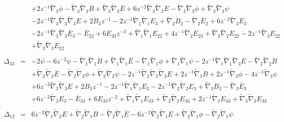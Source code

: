 \documentclass[10pt,letterpaper]{article}
\numberwithin{equation}{section}
\begin{document}
\begin{eqnarray}
&& + 2 z^{-1} \tilde{\nabla}_{3}\phi -  \tilde{\nabla}_{3}\tilde{\nabla}_{3}\dot{B} + \tilde{\nabla}_{3}\tilde{\nabla}_{3}\overset{..}{E} + 6 z^{-2} \tilde{\nabla}_{3}\tilde{\nabla}_{3}E -  \tilde{\nabla}_{3}\tilde{\nabla}_{3}\phi + \tilde{\nabla}_{3}\tilde{\nabla}_{3}\psi \nonumber \\ 
&& - 2 z^{-1} \tilde{\nabla}_{3}\tilde{\nabla}_{3}\tilde{\nabla}_{3}E+2 \dot{B}_{3} z^{-1} - 2 z^{-1} \tilde{\nabla}_{1}\tilde{\nabla}_{1}E_{3} + \tilde{\nabla}_{2}\dot{B}_{2} -  \tilde{\nabla}_{2}\overset{..}{E}_{2} + 6 z^{-2} \tilde{\nabla}_{3}E_{3} \nonumber \\ 
&& - 2 z^{-1} \tilde{\nabla}_{3}\tilde{\nabla}_{3}E_{3}- \overset{..}{E}_{22} + 6 E_{33} z^{-2} + \tilde{\nabla}_{1}\tilde{\nabla}_{1}E_{22} + 4 z^{-1} \tilde{\nabla}_{2}E_{23} + \tilde{\nabla}_{2}\tilde{\nabla}_{2}E_{22} - 2 z^{-1} \tilde{\nabla}_{3}E_{22} \nonumber \\ 
&& + \tilde{\nabla}_{3}\tilde{\nabla}_{3}E_{22}
\\  \nonumber\\ 
\Delta_{33}&=& -2 \overset{..}{\psi} - 6 z^{-2} \psi -  \tilde{\nabla}_{1}\tilde{\nabla}_{1}\dot{B} + \tilde{\nabla}_{1}\tilde{\nabla}_{1}\overset{..}{E} -  \tilde{\nabla}_{1}\tilde{\nabla}_{1}\phi + \tilde{\nabla}_{1}\tilde{\nabla}_{1}\psi - 2 z^{-1} \tilde{\nabla}_{1}\tilde{\nabla}_{1}\tilde{\nabla}_{3}E -  \tilde{\nabla}_{2}\tilde{\nabla}_{2}\dot{B} \nonumber \\ 
&& + \tilde{\nabla}_{2}\tilde{\nabla}_{2}\overset{..}{E} -  \tilde{\nabla}_{2}\tilde{\nabla}_{2}\phi + \tilde{\nabla}_{2}\tilde{\nabla}_{2}\psi - 2 z^{-1} \tilde{\nabla}_{2}\tilde{\nabla}_{2}\tilde{\nabla}_{3}E + 2 z^{-1} \tilde{\nabla}_{3}\dot{B} + 2 z^{-1} \tilde{\nabla}_{3}\phi - 4 z^{-1} \tilde{\nabla}_{3}\psi \nonumber \\ 
&& + 6 z^{-2} \tilde{\nabla}_{3}\tilde{\nabla}_{3}E+2 \dot{B}_{3} z^{-1} - 2 z^{-1} \tilde{\nabla}_{1}\tilde{\nabla}_{1}E_{3} - 2 z^{-1} \tilde{\nabla}_{2}\tilde{\nabla}_{2}E_{3} + \tilde{\nabla}_{3}\dot{B}_{3} -  \tilde{\nabla}_{3}\overset{..}{E}_{3} \nonumber \\ 
&& + 6 z^{-2} \tilde{\nabla}_{3}E_{3}- \overset{..}{E}_{33} + 6 E_{33} z^{-2} + \tilde{\nabla}_{1}\tilde{\nabla}_{1}E_{33} + \tilde{\nabla}_{2}\tilde{\nabla}_{2}E_{33} + 2 z^{-1} \tilde{\nabla}_{3}E_{33} + \tilde{\nabla}_{3}\tilde{\nabla}_{3}E_{33}
\\  \nonumber\\ 
\Delta_{12}&=& 6 z^{-2} \tilde{\nabla}_{1}\tilde{\nabla}_{2}E + \tilde{\nabla}_{2}\tilde{\nabla}_{1}\dot{B} -  \tilde{\nabla}_{2}\tilde{\nabla}_{1}\overset{..}{E} - 6 z^{-2} \tilde{\nabla}_{2}\tilde{\nabla}_{1}E + \tilde{\nabla}_{2}\tilde{\nabla}_{1}\phi -  \tilde{\nabla}_{2}\tilde{\nabla}_{1}\psi \nonumber \\ 

\end{eqnarray}
\end{document}

